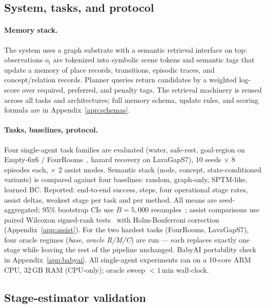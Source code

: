 \documentclass{article}
\begin{document}
\subsection{System, tasks, and protocol}
\label{sec:single-setup}

\paragraph{Memory stack.}
The system uses a graph substrate with a semantic retrieval interface on top: observations $o_t$ are tokenized into symbolic scene tokens and semantic tags that update a memory of place records, transitions, episodic traces, and concept/relation records. Planner queries return candidates by a weighted log-score over required, preferred, and penalty tags. The retrieval machinery is reused across all tasks and architectures; full memory schema, update rules, and scoring formula are in Appendix~\ref{app:schemas}.

\paragraph{Tasks, baselines, protocol.}
Four single-agent task families are evaluated (water, safe-rest, goal-region on Empty-6x6 / FourRooms~\citep{sutton1999between}, hazard recovery on LavaGapS7), 10 seeds $\times$ 8 episodes each, $\times$ 2 assist modes. Semantic stack (node, concept, state-conditioned variants) is compared against four baselines: random, graph-only, SPTM-like, learned BC. Reported: end-to-end success, steps, four operational stage rates, assist deltas, weakest stage per task and per method. All means are seed-aggregated; 95\% bootstrap CIs use $B{=}5{,}000$ resamples~\citep{efron1979bootstrap}; assist comparisons use paired Wilcoxon signed-rank tests~\citep{wilcoxon1945individual} with Holm-Bonferroni correction~\citep{holm1979simple} (Appendix~\ref{app:assist}). For the two hardest tasks (FourRooms, LavaGapS7), four oracle regimes (\emph{base}, \emph{oracle R/M/C}) are run — each replaces exactly one stage while leaving the rest of the pipeline unchanged. BabyAI portability check in Appendix~\ref{app:babyai}. All single-agent experiments ran on a 10-core ARM CPU, 32\,GB RAM (CPU-only); oracle sweep $<1$\,min wall-clock.

\subsection{Stage-estimator validation}
\label{sec:validation}
\end{document}
